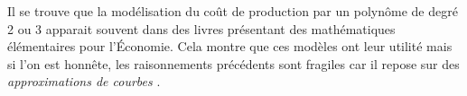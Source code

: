 Il se trouve que la modélisation du coût de production par un polynôme de degré 2 ou 3 apparait souvent dans des livres présentant des mathématiques élémentaires pour l'Économie. Cela montre que ces modèles ont leur utilité mais si l'on est honnête, les raisonnements précédents sont fragiles car il repose sur des \emph{\og approximations de courbes \fg}.